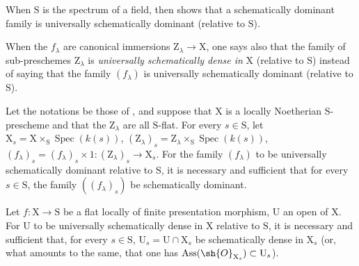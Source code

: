 When $\mathrm{S}$ is the spectrum of a field,  then shows that a schematically dominant family is universally schematically dominant (relative to $\mathrm{S}$).

When the $f_\lambda$ are canonical immersions $\mathrm{Z}_\lambda\to\mathrm{X}$, one says also that the family of sub-preschemes $\mathrm{Z}_\lambda$ is \emph{universally schematically dense in} $\mathrm{X}$ (relative to $\mathrm{S}$) instead of saying that the family $(f_\lambda)$ is universally schematically dominant (relative to $\mathrm{S}$).

\begin{theorem}[11.10.9]
\label{IV.11.10.9}
Let the notations be those of , and suppose that $\mathrm{X}$ is a locally Noetherian $\mathrm{S}$-prescheme and that the $\mathrm{Z}_\lambda$ are all $\mathrm{S}$-flat.
For every $s\in\mathrm{S}$, let $\mathrm{X}_s=\mathrm{X}\times_\mathrm{S}\operatorname{Spec}(k(s))$, $(\mathrm{Z}_\lambda)_s=\mathrm{Z}_\lambda\times_\mathrm{S}\operatorname{Spec}(k(s))$, $(f_\lambda)_s=(f_\lambda)_s\times 1:(\mathrm{Z}_\lambda)_s\to\mathrm{X}_s$.
For the family $(f_\lambda)$ to be universally schematically dominant relative to $\mathrm{S}$, it is necessary and sufficient that for every $s\in\mathrm{S}$, the family $((f_\lambda)_s)$ be schematically dominant.
\end{theorem}

\begin{proposition}[11.10.10]
\label{IV.11.10.10}
Let $f:\mathrm{X}\to\mathrm{S}$ be a flat locally of finite presentation morphism, $\mathrm{U}$ an open of $\mathrm{X}$.
For $\mathrm{U}$ to be universally schematically dense in $\mathrm{X}$ relative to $\mathrm{S}$, it is necessary and sufficient that, for every $s\in\mathrm{S}$, $\mathrm{U}_s=\mathrm{U}\cap\mathrm{X}_s$ be schematically dense in $\mathrm{X}_s$ (or, what amounts to the same, that one has $\operatorname{Ass}(\sh{O}_{\mathrm{X}_s})\subset\mathrm{U}_s$).
\end{proposition}
